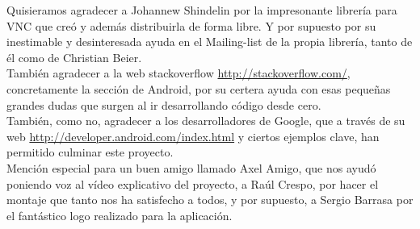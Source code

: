 Quisieramos agradecer a Johannew Shindelin por la impresonante librer\'ia para VNC que cre\'o y adem\'as distribuirla de forma libre. Y por supuesto por su inestimable y desinteresada ayuda en el Mailing-list de la propia librer\'ia, tanto de \'el como de Christian Beier.\\

Tambi\'en agradecer a la web stackoverflow \url{http://stackoverflow.com/}, concretamente la secci\'on de Android, por su certera ayuda con esas pequeñas grandes dudas que surgen al ir desarrollando c\'odigo desde cero.\\

Tambi\'en, como no, agradecer a los desarrolladores de Google, que a trav\'es de su web \url{http://developer.android.com/index.html} y ciertos ejemplos clave, han permitido culminar este proyecto.\\

Menci\'on especial para un buen amigo llamado Axel Amigo, que nos ayud\'o poniendo voz al v\'ideo explicativo del proyecto, a Ra\'ul Crespo, por hacer el montaje que tanto nos ha satisfecho a todos, y por supuesto, a Sergio Barrasa por el fant\'astico logo realizado para la aplicaci\'on.\\
